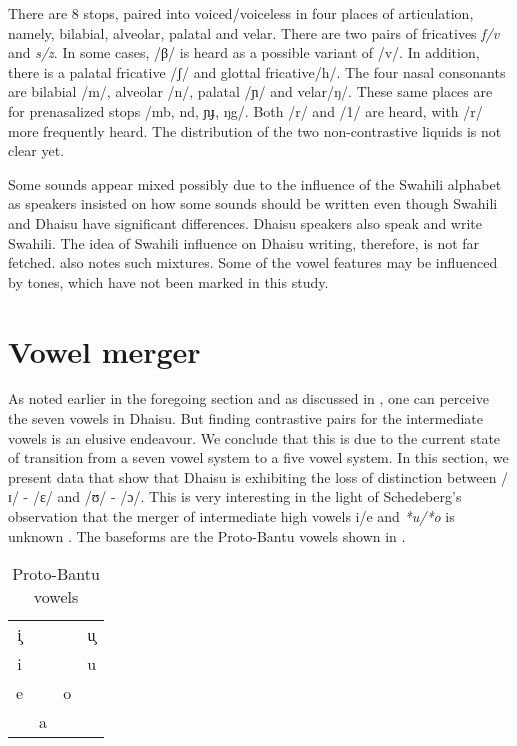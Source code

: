 \documentclass[output=paper,colorlinks,citecolor=brown]{langscibook}
\begin{document}
There are 8 stops, paired into voiced/voiceless in four places of articulation, namely, bilabial, alveolar, palatal and velar. There are two pairs of fricatives \textit{f/v} and \textit{s/z}. In some cases, /β/ is heard as a possible variant of /v/. In addition, there is a palatal fricative /ʃ/ and glottal fricative/h/. The four nasal consonants are bilabial /m/, alveolar /n/, palatal /ɲ/ and velar/ŋ/. These same places are for prenasalized stops /mb, nd, ɲɟ, ŋg/. Both /r/ and /1/ are heard, with /r/ more frequently heard. The distribution of the two non-contrastive liquids is not clear yet.
 
Some sounds appear mixed possibly due to the influence of the Swahili alphabet as speakers insisted on how some sounds should be written even though Swahili and Dhaisu have significant differences. Dhaisu speakers also speak and write Swahili. The idea of Swahili influence on Dhaisu writing, therefore, is not far fetched. \cite{Nurse2000} also notes such mixtures. Some of the vowel features may be influenced by tones, which have not been marked in this study.


\section{Vowel merger}\label{sec:ngonyani:3}

As noted earlier in the foregoing section and as discussed in \cite{Nurse2000}, one can perceive the seven vowels in Dhaisu. But finding contrastive pairs for the intermediate vowels is an elusive endeavour. We conclude that this is due to the current state of transition from a seven vowel system to a five vowel system. In this section, we present data that show that Dhaisu is exhibiting the loss of distinction between /ɪ/ - /ɛ/ and /ʊ/ - /ɔ/. This is very interesting in the light of Schedeberg's observation that the merger of intermediate high vowels i/e and \textit{*u/*o} is unknown \citep[74]{Schadeberg1995}. The baseforms are the Proto-Bantu vowels  shown in .

\begin{table}
	\caption{Proto-Bantu vowels \citep[82]{Meeussen1967}}
    \label{tab:ngonyani:3}
        \begin{tabular}{cccc}
        i̧ &    &   & u̧\\
        i &    &   & u\\
        e &    & o &\\
          & a  &   &\\
        \end{tabular}
\end{table}
\end{document}
